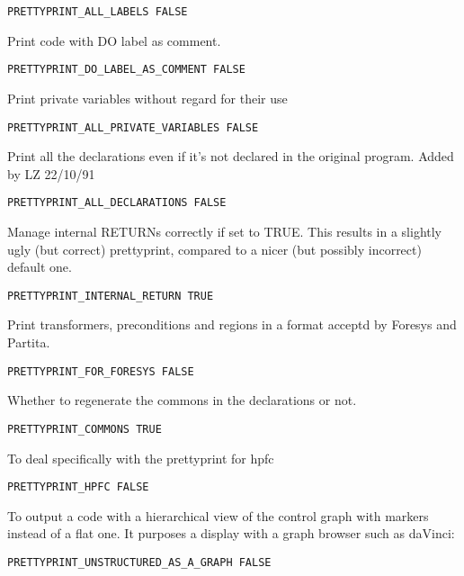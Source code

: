 \begin{verbatim}
PRETTYPRINT_ALL_LABELS FALSE
\end{verbatim}

Print code with DO label as comment.

\begin{verbatim}
PRETTYPRINT_DO_LABEL_AS_COMMENT FALSE
\end{verbatim}

Print private variables without regard for their use

\begin{verbatim}
PRETTYPRINT_ALL_PRIVATE_VARIABLES FALSE
\end{verbatim}


Print all the declarations even if it's not declared in the original program.
Added by LZ 22/10/91

\begin{verbatim}
PRETTYPRINT_ALL_DECLARATIONS FALSE
\end{verbatim}

Manage internal RETURNs correctly if set to TRUE.  This results in a
slightly ugly (but correct) prettyprint, compared to a nicer (but
possibly incorrect) default one.

\begin{verbatim}
PRETTYPRINT_INTERNAL_RETURN TRUE
\end{verbatim}

Print transformers, preconditions and regions in a format acceptd by Foresys and
Partita. 

\begin{verbatim}
PRETTYPRINT_FOR_FORESYS FALSE
\end{verbatim}

Whether to regenerate the commons in the declarations or not.

\begin{verbatim}
PRETTYPRINT_COMMONS TRUE
\end{verbatim}

To deal specifically with the prettyprint for hpfc

\begin{verbatim}
PRETTYPRINT_HPFC FALSE
\end{verbatim}

To output a code with a hierarchical view of the control graph with
markers instead of a flat one. It purposes a display with a graph
browser such as daVinci:
\begin{verbatim}
PRETTYPRINT_UNSTRUCTURED_AS_A_GRAPH FALSE
\end{verbatim}

